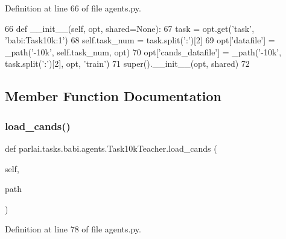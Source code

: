 Definition at line 66 of file agents.\+py.


\begin{DoxyCode}
66     \textcolor{keyword}{def }\_\_init\_\_(self, opt, shared=None):
67         task = opt.get(\textcolor{stringliteral}{'task'}, \textcolor{stringliteral}{'babi:Task10k:1'})
68         self.task\_num = task.split(\textcolor{stringliteral}{':'})[2]
69         opt[\textcolor{stringliteral}{'datafile'}] = \_path(\textcolor{stringliteral}{'-10k'}, self.task\_num, opt)
70         opt[\textcolor{stringliteral}{'cands\_datafile'}] = \_path(\textcolor{stringliteral}{'-10k'}, task.split(\textcolor{stringliteral}{':'})[2], opt, \textcolor{stringliteral}{'train'})
71         super().\_\_init\_\_(opt, shared)
72 
\end{DoxyCode}


\subsection{Member Function Documentation}
\mbox{\label{classparlai_1_1tasks_1_1babi_1_1agents_1_1Task10kTeacher_af80438ce3c1fa375e4dbed775afb9ed2}} 
\subsubsection{\texorpdfstring{load\+\_\+cands()}{load\_cands()}}
{\footnotesize\ttfamily def parlai.\+tasks.\+babi.\+agents.\+Task10k\+Teacher.\+load\+\_\+cands (\begin{DoxyParamCaption}\item[{}]{self,  }\item[{}]{path }\end{DoxyParamCaption})}



Definition at line 78 of file agents.\+py.


